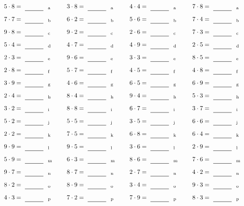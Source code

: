 \documentclass
[
  draft    = true,
  fontsize = 11pt,
  parskip  = half-
]
{scrartcl}
\begin{document}
\par\vfill\par
\begin{align*}
    \pline{5\cdot8}&=\rline{a}
  & \pline{3\cdot8}&=\rline{a}
  & \pline{4\cdot4}&=\rline{a}
  & \pline{7\cdot8}&=\rline{a} \\[1ex]
    \pline{7\cdot7}&=\rline{b}
  & \pline{6\cdot2}&=\rline{b}
  & \pline{5\cdot6}&=\rline{b}
  & \pline{7\cdot4}&=\rline{b} \\[1ex]
    \pline{9\cdot8}&=\rline{c}
  & \pline{9\cdot2}&=\rline{c}
  & \pline{2\cdot6}&=\rline{c}
  & \pline{7\cdot3}&=\rline{c} \\[1ex]
    \pline{5\cdot4}&=\rline{d}
  & \pline{4\cdot7}&=\rline{d}
  & \pline{4\cdot9}&=\rline{d}
  & \pline{2\cdot5}&=\rline{d} \\[1ex]
    \pline{2\cdot3}&=\rline{e}
  & \pline{9\cdot6}&=\rline{e}
  & \pline{3\cdot3}&=\rline{e}
  & \pline{8\cdot5}&=\rline{e} \\[1ex]
    \pline{2\cdot8}&=\rline{f}
  & \pline{5\cdot7}&=\rline{f}
  & \pline{4\cdot5}&=\rline{f}
  & \pline{4\cdot8}&=\rline{f} \\[1ex]
    \pline{3\cdot9}&=\rline{g}
  & \pline{4\cdot6}&=\rline{g}
  & \pline{6\cdot5}&=\rline{g}
  & \pline{6\cdot9}&=\rline{g} \\[1ex]
    \pline{2\cdot4}&=\rline{h}
  & \pline{8\cdot4}&=\rline{h}
  & \pline{9\cdot4}&=\rline{h}
  & \pline{5\cdot3}&=\rline{h} \\[1ex]
    \pline{3\cdot2}&=\rline{i}
  & \pline{8\cdot8}&=\rline{i}
  & \pline{6\cdot7}&=\rline{i}
  & \pline{3\cdot7}&=\rline{i} \\[1ex]
    \pline{5\cdot2}&=\rline{j}
  & \pline{5\cdot5}&=\rline{j}
  & \pline{3\cdot5}&=\rline{j}
  & \pline{6\cdot6}&=\rline{j} \\[1ex]
    \pline{2\cdot2}&=\rline{k}
  & \pline{7\cdot5}&=\rline{k}
  & \pline{6\cdot8}&=\rline{k}
  & \pline{6\cdot4}&=\rline{k} \\[1ex]
    \pline{9\cdot9}&=\rline{l}
  & \pline{9\cdot5}&=\rline{l}
  & \pline{3\cdot6}&=\rline{l}
  & \pline{2\cdot9}&=\rline{l} \\[1ex]
    \pline{5\cdot9}&=\rline{m}
  & \pline{6\cdot3}&=\rline{m}
  & \pline{8\cdot6}&=\rline{m}
  & \pline{7\cdot6}&=\rline{m} \\[1ex]
    \pline{9\cdot7}&=\rline{n}
  & \pline{8\cdot7}&=\rline{n}
  & \pline{2\cdot7}&=\rline{n}
  & \pline{4\cdot2}&=\rline{n} \\[1ex]
    \pline{8\cdot2}&=\rline{o}
  & \pline{8\cdot9}&=\rline{o}
  & \pline{3\cdot4}&=\rline{o}
  & \pline{9\cdot3}&=\rline{o} \\[1ex]
    \pline{4\cdot3}&=\rline{p}
  & \pline{7\cdot2}&=\rline{p}
  & \pline{7\cdot9}&=\rline{p}
  & \pline{8\cdot3}&=\rline{p}
\end{align*}
\end{document}
